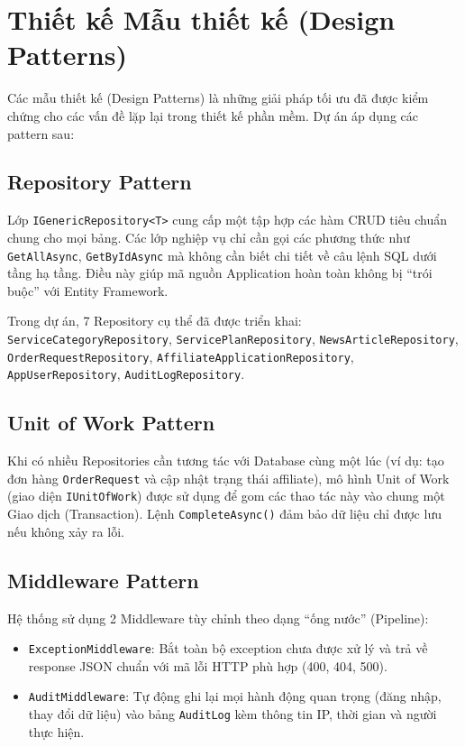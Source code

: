 \section{Thiết kế Mẫu thiết kế (Design Patterns)}
Các mẫu thiết kế (Design Patterns) \cite{gof} là những giải pháp tối ưu đã được kiểm chứng cho các vấn đề lặp lại trong thiết kế phần mềm. Dự án áp dụng các pattern sau:

\subsection{Repository Pattern}
Lớp \texttt{IGenericRepository<T>} cung cấp một tập hợp các hàm CRUD tiêu chuẩn chung cho mọi bảng. Các lớp nghiệp vụ chỉ cần gọi các phương thức như \texttt{GetAllAsync}, \texttt{GetByIdAsync} mà không cần biết chi tiết về câu lệnh SQL dưới tầng hạ tầng. Điều này giúp mã nguồn Application hoàn toàn không bị ``trói buộc'' với Entity Framework.

Trong dự án, 7 Repository cụ thể đã được triển khai: \texttt{ServiceCategoryRepository}, \texttt{ServicePlanRepository}, \texttt{NewsArticleRepository}, \texttt{OrderRequestRepository}, \texttt{AffiliateApplicationRepository}, \texttt{AppUserRepository}, \texttt{AuditLogRepository}.

\subsection{Unit of Work Pattern}
Khi có nhiều Repositories cần tương tác với Database cùng một lúc (ví dụ: tạo đơn hàng \texttt{OrderRequest} và cập nhật trạng thái affiliate), mô hình Unit of Work (giao diện \texttt{IUnitOfWork}) được sử dụng để gom các thao tác này vào chung một Giao dịch (Transaction). Lệnh \texttt{CompleteAsync()} đảm bảo dữ liệu chỉ được lưu nếu không xảy ra lỗi.

\subsection{Middleware Pattern}
Hệ thống sử dụng 2 Middleware tùy chỉnh theo dạng ``ống nước'' (Pipeline):
\begin{itemize}
    \item \texttt{ExceptionMiddleware}: Bắt toàn bộ exception chưa được xử lý và trả về response JSON chuẩn với mã lỗi HTTP phù hợp (400, 404, 500).
    \item \texttt{AuditMiddleware}: Tự động ghi lại mọi hành động quan trọng (đăng nhập, thay đổi dữ liệu) vào bảng \texttt{AuditLog} kèm thông tin IP, thời gian và người thực hiện.
\end{itemize}

